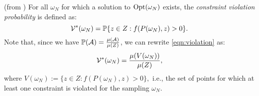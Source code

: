 \begin{definition}(from \cite{campi}) For all $\omega_N$ for which a solution to $\text{Opt}(\omega_N)$ exists, the \emph{constraint violation probability} is defined as:
\begin{equation}\label{eqn:violation}
\mathcal{V}^*(\omega_N)=
      \mathbb{P}\{z \in Z: f(P(\omega_N), z) > 0\}.
\end{equation}
Note that, since we have $\mathbb{P}(\mathcal{A}) = \frac{\mu(\mathcal{A})}{\mu(Z)}$, we can rewrite \eqref{eqn:violation} as:
\begin{equation*}
\mathcal{V}^*(\omega_N)=
      \frac{\mu(V(\omega_N))}{\mu(Z)},
\end{equation*}
where $V(\omega_N):=\{z \in Z: f(P(\omega_N), z) > 0\},$ i.e., the set of points for which at least one constraint is violated for the sampling $\omega_N$.
\end{definition}
%

